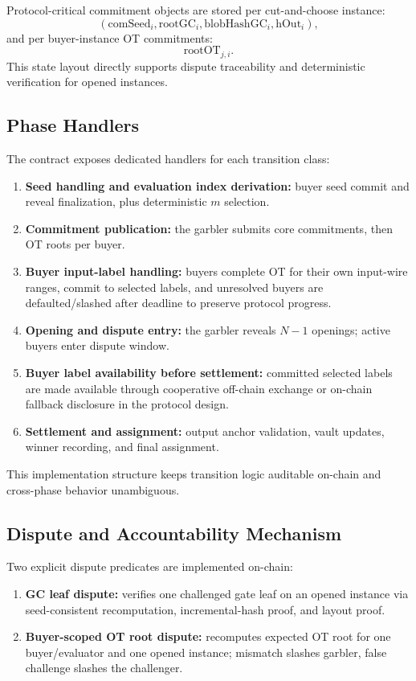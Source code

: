 \documentclass[final,twoside]{vutinfth}
\begin{document}
Protocol-critical commitment objects are stored per cut-and-choose instance:
\[
(\mathrm{comSeed}_i,\mathrm{rootGC}_i,\mathrm{blobHashGC}_i,\mathrm{hOut}_i),
\]
and per buyer-instance OT commitments:
\[
\mathrm{rootOT}_{j,i}.
\]
This state layout directly supports dispute traceability and deterministic verification for opened instances.

\subsection{Phase Handlers}
The contract exposes dedicated handlers for each transition class:
\begin{enumerate}
\item \textbf{Seed handling and evaluation index derivation:} buyer seed commit and reveal finalization, plus deterministic $m$ selection.
\item \textbf{Commitment publication:} the garbler submits core commitments, then OT roots per buyer.
\item \textbf{Buyer input-label handling:} buyers complete OT for their own input-wire ranges, commit to selected labels, and unresolved buyers are defaulted/slashed after deadline to preserve protocol progress.
\item \textbf{Opening and dispute entry:} the garbler reveals $N-1$ openings; active buyers enter dispute window.
\item \textbf{Buyer label availability before settlement:} committed selected labels are made available through cooperative off-chain exchange or on-chain fallback disclosure in the protocol design.
\item \textbf{Settlement and assignment:} output anchor validation, vault updates, winner recording, and final assignment.
\end{enumerate}

This implementation structure keeps transition logic auditable on-chain and cross-phase behavior unambiguous.

\subsection{Dispute and Accountability Mechanism}
Two explicit dispute predicates are implemented on-chain:
\begin{enumerate}
\item \textbf{GC leaf dispute:} verifies one challenged gate leaf on an opened instance via seed-consistent recomputation, incremental-hash proof, and layout proof.
\item \textbf{Buyer-scoped OT root dispute:} recomputes expected OT root for one buyer/evaluator and one opened instance; mismatch slashes garbler, false challenge slashes the challenger.
\end{enumerate}
\end{document}
